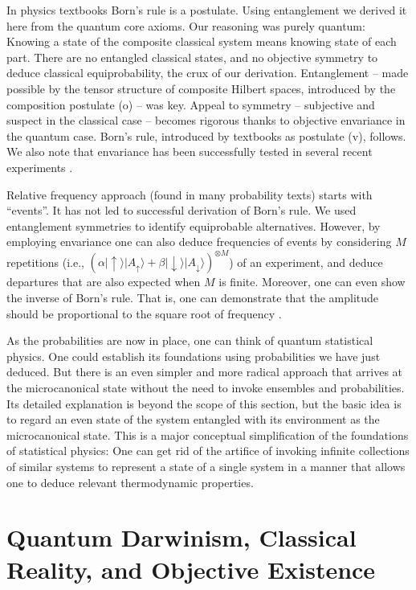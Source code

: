 \documentclass[aps,amsmath,amssymb,amsfonts,floatfix]{revtex4-1}
\newcommand{\ket}[1]    {| #1 \rangle}
\newcommand{\+}         {\dagger}
\begin{document}
{In physics textbooks Born's rule is a postulate. Using entanglement we derived it here from the quantum core axioms. Our reasoning was purely quantum: Knowing a state of the composite classical system means knowing state of each part. There are no entangled classical states, and no objective symmetry to deduce classical equiprobability, the crux of our derivation. Entanglement -- made possible by the tensor structure of composite Hilbert spaces, introduced by the composition postulate (o) -- was key. Appeal to symmetry -- subjective and suspect in the classical case -- becomes rigorous thanks to objective envariance in the quantum case. 
Born's rule, introduced by textbooks as postulate (v), follows. We also note that envariance has been successfully tested in several recent experiments \cite{Laflamme,Ebrahim,Deffner,Ferrari}.


Relative frequency approach (found in many probability texts) starts with ``events''. It has not led to successful derivation of Born's rule.
We used entanglement symmetries to identify equiprobable alternatives. However, by employing envariance one can also deduce frequencies of events by considering $M$ repetitions (i.e., $(\alpha\ket \uparrow \ket {A_\uparrow}  + \beta \ket \downarrow \ket {A_\downarrow})^{\otimes M}$) of an experiment, and deduce departures that are also expected when $M$ is finite. Moreover, one can even show the inverse of Born's rule. That is, one can demonstrate that the amplitude should be proportional to the square root of frequency \cite{Zurek11}.

As the probabilities are now in place, one can think of quantum statistical physics. One could establish its foundations using probabilities we have just deduced. But there is an even simpler and more radical approach \cite{DefZur,Zurek18a} that arrives at the microcanonical state without the need to invoke ensembles and probabilities. Its detailed explanation is beyond the scope of this section, but the basic idea is to regard an even state of the system entangled with its environment as the microcanonical state. This is a major conceptual simplification of the foundations of statistical physics: One can get rid of the artifice of invoking infinite collections of similar systems to represent a state of a single system in a manner that allows one to deduce relevant thermodynamic properties. 
\section{Quantum Darwinism, Classical Reality, and Objective Existence}

}
\end{document}
